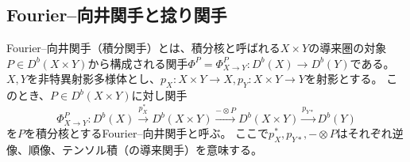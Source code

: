 \documentclass[uplatex,a4paper,dvipdfmx]{jsarticle}
\theoremstyle{plain}
\theoremstyle{definition}
\begin{document}
\subsection{Fourier--向井関手と捻り関手}
Fourier--向井関手（積分関手）とは、積分核と呼ばれる$X \times Y$の導来圏の対象$P \in D^b(X \times Y)$から構成される関手$\Phi^P =\Phi^P_{X \to Y}\colon D^b(X) \to D^b(Y)$である。
$X, Y$を非特異射影多様体とし、$p_X \colon X\times Y \to X, p_Y \colon X \times Y \to Y$を射影とする。
このとき、$P \in D^b(X \times Y)$に対し関手
\begin{equation}
	\Phi^P_{X \to Y} \colon D^b(X) \xrightarrow{p_X^*} D^b(X \times Y) \xrightarrow{ - \otimes P} D^b(X \times Y) \xrightarrow{p_{Y*}} D^b(Y)
\end{equation}
を$P$を積分核とするFourier--向井関手と呼ぶ。
ここで$p_X^*, p_{Y*}, - \otimes P$はそれぞれ逆像、順像、テンソル積（の導来関手）を意味する。
\end{document}
